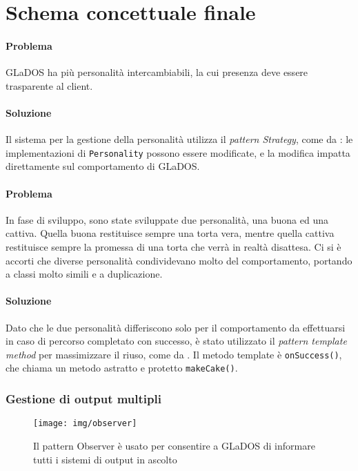 \documentclass[a4paper,12pt]{report}
\begin{document}
\section{Schema concettuale finale}

\paragraph{Problema} GLaDOS ha più personalità intercambiabili, la cui presenza deve essere trasparente al client.

\paragraph{Soluzione} Il sistema per la gestione della personalità utilizza il \textit{pattern Strategy}, come da
: le implementazioni di \texttt{Personality} possono essere modificate, e la
modifica impatta direttamente sul comportamento di GLaDOS.


\paragraph{Problema} In fase di sviluppo, sono state sviluppate due personalità, una buona ed una cattiva.
Quella buona restituisce sempre una torta vera, mentre quella cattiva restituisce sempre la
promessa di una torta che verrà in realtà disattesa.
Ci si è accorti che diverse personalità condividevano molto del comportamento,
portando a classi molto simili e a duplicazione.

\paragraph{Soluzione} Dato che le due personalità differiscono solo per il comportamento da effettuarsi in caso di percorso completato con successo,
è stato utilizzato il \textit{pattern template method} per massimizzare il riuso, come da .
Il metodo template è \texttt{onSuccess()}, che chiama un metodo astratto e protetto
\texttt{makeCake()}.

\subsubsection{Gestione di output multipli}

\begin{figure}[H]
\centering{}
\texttt{[image: img/observer]}
\caption{Il pattern Observer è usato per consentire a GLaDOS di informare tutti i sistemi di output in ascolto}
\label{img:observer}
\end{figure}
\end{document}
